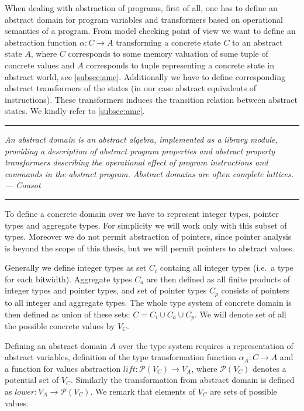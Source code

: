 When dealing with abstraction of programs, first of all, one has to define an
abstract domain for program variables and transformers based on operational
semantics of a program. From model checking point of view we want to define an
abstraction function $\alpha \colon C \to A$ transforming a concrete state $C$
to an abstract state $A$, where $C$ corresponds to some memory valuation of some
tuple of concrete values and $A$ corresponds to tuple representing a concrete
state in abstract world, see \autoref{subsec:amc}. Additionally we have to
define corresponding abstract transformers of the states (in our case abstract
equivalents of \LLVM instructions). These transformers induces the transition
relation between abstract states. We kindly refer to \autoref{subsec:amc}.

\bigskip

\hrule

\bigskip
\noindent
\textit{An abstract domain is an abstract algebra, implemented as a library module,
providing a description of abstract program properties and abstract property
transformers describing the operational effect of program instructions and
commands in the abstract program. Abstract domains are often complete lattices. --- Cousot \cite{Cousot79} }
\bigskip

\hrule

\bigskip

To define a concrete domain over \LLVM we have to represent integer types,
pointer types and aggregate types. For simplicity we will work only with this
subset of \LLVM types. Moreover we do not permit abstraction of pointers, since
pointer analysis is beyond the scope of this thesis, but we will permit
pointers to abstract values.

Generally we define integer types as set $C_{i}$ containg all \LLVM integer
types (i.e.~a type for each bitwidth).
Aggregate types $C_a$ are then defined as all finite products of integer types and
pointer types, and set of pointer types $C_p$ consists of pointers to all integer
and aggregate types. The whole type system of concrete domain is
then defined as union of these sets: $C = C_i \cup C_a \cup C_p$. We will denote
set of all the possible concrete values by $V_C$.

Defining an abstract domain $A$ over the \LLVM type system requires a representation of
abstract variables, definition of the type transformation function $\alpha_A \colon C \to A$
and a function for values abstraction $\textit{lift} \colon \mathcal{P}(V_C) \to
V_A$, where $\mathcal{P}(V_C)$ denotes a potential set of $V_C$.
Similarly the transformation from abstract domain is defined as
$\textit{lower} \colon V_A \to \mathcal{P}(V_C)$. We remark that elements of $V_C$
are sets of possible values.

